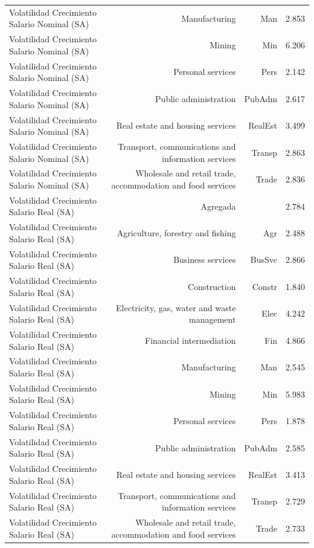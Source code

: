 \begin{longtable}{lrrr}
Volatilidad Crecimiento Salario Nominal (SA) & Manufacturing & Man & 2.853 \\ 
Volatilidad Crecimiento Salario Nominal (SA) & Mining & Min & 6.206 \\ 
Volatilidad Crecimiento Salario Nominal (SA) & Personal services & Pers & 2.142 \\ 
Volatilidad Crecimiento Salario Nominal (SA) & Public administration & PubAdm & 2.617 \\ 
Volatilidad Crecimiento Salario Nominal (SA) & Real estate and housing services & RealEst & 3.499 \\ 
Volatilidad Crecimiento Salario Nominal (SA) & Transport, communications and information services & Transp & 2.863 \\ 
Volatilidad Crecimiento Salario Nominal (SA) & Wholesale and retail trade, accommodation and food services & Trade & 2.836 \\ 
Volatilidad Crecimiento Salario Real (SA) & Agregada &  & 2.784 \\ 
Volatilidad Crecimiento Salario Real (SA) & Agriculture, forestry and fishing & Agr & 2.488 \\ 
Volatilidad Crecimiento Salario Real (SA) & Business services & BusSvc & 2.866 \\ 
Volatilidad Crecimiento Salario Real (SA) & Construction & Constr & 1.840 \\ 
Volatilidad Crecimiento Salario Real (SA) & Electricity, gas, water and waste management & Elec & 4.242 \\ 
Volatilidad Crecimiento Salario Real (SA) & Financial intermediation & Fin & 4.866 \\ 
Volatilidad Crecimiento Salario Real (SA) & Manufacturing & Man & 2.545 \\ 
Volatilidad Crecimiento Salario Real (SA) & Mining & Min & 5.983 \\ 
Volatilidad Crecimiento Salario Real (SA) & Personal services & Pers & 1.878 \\ 
Volatilidad Crecimiento Salario Real (SA) & Public administration & PubAdm & 2.585 \\ 
Volatilidad Crecimiento Salario Real (SA) & Real estate and housing services & RealEst & 3.413 \\ 
Volatilidad Crecimiento Salario Real (SA) & Transport, communications and information services & Transp & 2.729 \\ 
Volatilidad Crecimiento Salario Real (SA) & Wholesale and retail trade, accommodation and food services & Trade & 2.733 \\ 

\end{longtable}
